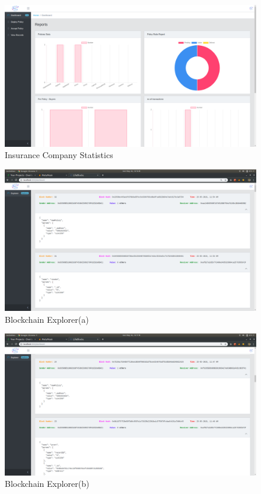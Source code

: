 \begin{figure}[!b]
	\centering
	\includegraphics[width=\linewidth]{Images/Organisation/InsuranceCompanyStatistics1.png}
	\caption{Insurance Company Statistics }
\end{figure}
\begin{figure}[!b]
	\centering
	\includegraphics[width=\linewidth]{Images/Explorer/Screenshot1.png}
	\caption{Blockchain Explorer(a)}
\end{figure}
\begin{figure}[!b]
	\centering
	\includegraphics[width=\linewidth]{Images/Explorer/Screenshot2.png}
	\caption{Blockchain Explorer(b) }
\end{figure}

